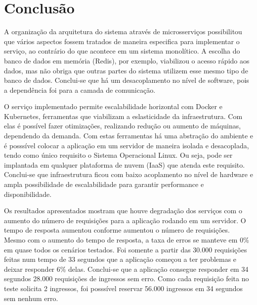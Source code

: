 \chapter*[Conclusão]{Conclusão}

A organização da arquitetura do sistema através de microsserviços possibilitou
que vários aspectos fossem tratados de maneira especifica para implementar o serviço,
ao contrário do que acontece em um sistema monolítico.
A escolha do banco de dados em memória (Redis), por exemplo,
viabilizou o acesso rápido aos dados, mas não obriga que outras partes do sistema
utilizem esse mesmo tipo de banco de dados.
Conclui-se que há um desacoplamento no nível de software, pois a dependência foi
para a camada de comunicação.

O serviço implementado permite escalabilidade horizontal com
Docker e Kubernetes, ferramentas que viabilizam a eslasticidade da infraestrutura.
Com elas é possível fazer otimizações, realizando
redução ou aumento de máquinas, dependendo da demanda.
Com estas ferramentas há uma abstração do ambiente e é posssível colocar a aplicação
em um servidor de maneira isolada e desacoplada, tendo como único requisito
o Sistema Operacional Linux.
Ou seja, pode ser implantada em qualquer plataforma de nuvem (IaaS) que atenda
este requisito.
Conclui-se que infraestrutura ficou com baixo acoplamento no nível de hardware
e ampla possibilidade de escalabilidade para garantir performance e disponibilidade.

Os resultados apresentados mostram que houve degradação dos serviços com o aumento do
número de requisições para a aplicação rodando em um servidor.
O tempo de resposta aumentou conforme aumentou o número de requisições.
Mesmo com o aumento do tempo de resposta, a taxa de erros se manteve em 0\% em
quase todos os cenários testados.
Foi somente a partir das 30.000 requisições feitas num tempo de 33 segundos que
a aplicação começou a ter problemas e deixar responder 6\% delas.
Conclui-se que a aplicação consegue responder em 34 segundos
28.000 requisições de ingressos sem erro.
Como cada requisição feita no teste solicita 2 ingressos, foi posssível
reservar 56.000 ingressos em 34 segundos sem nenhum erro.




